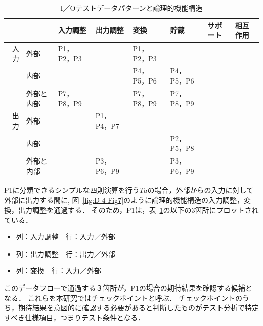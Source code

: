 \begin{table}[htbp]
  \centering
  \caption{I／Oテストデータパターンと論理的機能構造}
    \begin{tabular}{|r|p{4em}|l|l|l|p{4em}|l|l|}
    \hline
          & \multicolumn{1}{l|}{} & \multicolumn{1}{p{4em}|}{入力調整} & \multicolumn{1}{p{4em}|}{出力調整} & \multicolumn{1}{p{4em}|}{変換} & 貯蔵 & \multicolumn{1}{p{2em}|}{サポート} & \multicolumn{1}{p{1.915em}|}{相互作用} \bigstrut\\
    \hline
    \multicolumn{1}{|p{1.5em}|}{入力} & 外部 & \multicolumn{1}{p{4em}|}{P1，P2，P3} &       & \multicolumn{1}{p{4em}|}{P1，P2，P3} & \multicolumn{1}{l|}{} &       &  \bigstrut\\
\cline{2-8}          & 内部 &       &       & \multicolumn{1}{p{4em}|}{P4，P5，P6} & P4，P5，P6 &       &  \bigstrut\\
\cline{2-8}          & 外部と内部 & \multicolumn{1}{p{4em}|}{P7，P8，P9} &       & \multicolumn{1}{p{4em}|}{P7，P8，P9} & P7，P8，P9 &       &  \bigstrut\\
    \hline
    \multicolumn{1}{|p{1.5em}|}{出力} & 外部 &       & \multicolumn{1}{p{4em}|}{P1，P4，P7} &       & \multicolumn{1}{l|}{} &       &  \bigstrut\\
\cline{2-8}          & 内部 &       &       &       & P2，P5，P8 &       &  \bigstrut\\
\cline{2-8}          & 外部と内部 &       & P3，P6，P9 &       & P3，P6，P9 &       &  \bigstrut\\
    \hline
    \end{tabular}%
  \label{tab:D-4-tab1}%
\end{table}%


P1に分類できるシンプルな四則演算を行う$Ta$の場合，外部からの入力に対して外部に出力する間に,
図~\ref{fig:D-4-Fig7}のように論理的機能構造の入力調整，変換，出力調整を通過する．
そのため，P1は，表~\ref{tab:D-4-tab1}の以下の3箇所にプロットされている．
\begin{itemize}
  \item 列：入力調整　行：入力／外部
  \item 列：出力調整　行：出力／外部
  \item 列：変換　行：入力／外部
\end{itemize}

このデータフローで通過する３箇所が，P1の場合の期待結果を確認する候補となる．
これらを本研究ではチェックポイントと呼ぶ．
チェックポイントのうち，期待結果を意図的に確認する必要があると判断したものがテスト分析で特定すべき仕様項目，つまりテスト条件となる．

